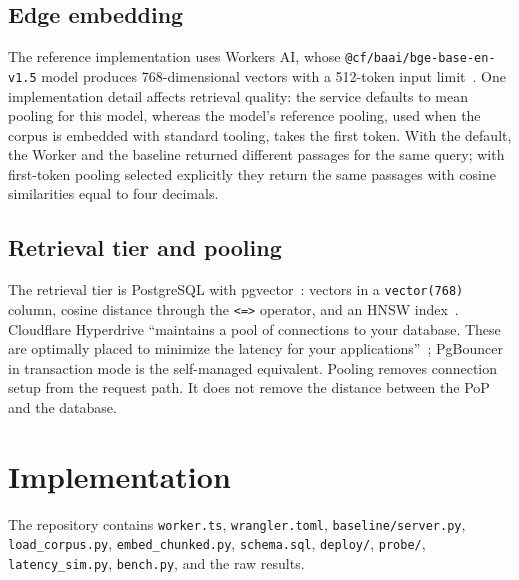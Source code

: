 \documentclass[conference]{IEEEtran}
\newcommand{\code}[1]{\texttt{#1}}
\begin{document}
\subsection{Edge embedding}
The reference implementation uses Workers AI, whose \code{@cf/baai/bge-base-en-v1.5} model
produces 768-dimensional vectors with a 512-token input limit~\cite{bge}. One implementation
detail affects retrieval quality: the service defaults to mean pooling for this model, whereas the
model's reference pooling, used when the corpus is embedded with standard tooling, takes the first
token. With the default, the Worker and the baseline returned different passages for the same
query; with first-token pooling selected explicitly they return the same passages with cosine
similarities equal to four decimals.

\subsection{Retrieval tier and pooling}
The retrieval tier is PostgreSQL with pgvector~\cite{pgvector}: vectors in a \code{vector(768)}
column, cosine distance through the \code{<=>} operator, and an HNSW index~\cite{malkov2018}.
Cloudflare Hyperdrive ``maintains a pool of connections to your database. These are optimally
placed to minimize the latency for your applications''~\cite{hyperdrivedocs}; PgBouncer in
transaction mode is the self-managed equivalent. Pooling removes connection setup from the request
path. It does not remove the distance between the PoP and the database.

\section{Implementation}
The repository contains \code{worker.ts}, \code{wrangler.toml}, \code{baseline/server.py},
\code{load\_corpus.py}, \code{embed\_chunked.py}, \code{schema.sql}, \code{deploy/},
\code{probe/}, \code{latency\_sim.py}, \code{bench.py}, and the raw results.
\end{document}
